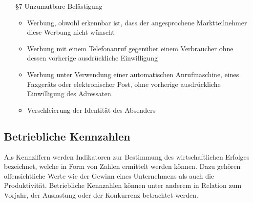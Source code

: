 \begin{itemize}
	\item[§7] Unzumutbare Belästigung
		\begin{itemize}
			\item Werbung, obwohl erkennbar ist, dass der angesprochene Marktteilnehmer diese Werbung nicht wünscht
			\item Werbung mit einem Telefonanruf gegenüber einem Verbraucher ohne dessen vorherige ausdrückliche Einwilligung
			\item Werbung unter Verwendung einer automatischen Anrufmaschine, eines Faxgeräts oder elektronischer Post, ohne vorherige ausdrückliche Einwilligung des Adressaten
			\item Verschleierung der Identität des Absenders
		\end{itemize}
\end{itemize}



\subsection{Betriebliche Kennzahlen}

Als Kennziffern werden Indikatoren zur Bestimmung des wirtschaftlichen Erfolges bezeichnet, welche in Form von Zahlen ermittelt werden können. Dazu gehören offensichtliche Werte wie der Gewinn eines Unternehmens als auch die Produktivität. Betriebliche Kennzahlen können unter anderem in Relation zum Vorjahr, der Auslastung oder der Konkurrenz betrachtet werden.\\


